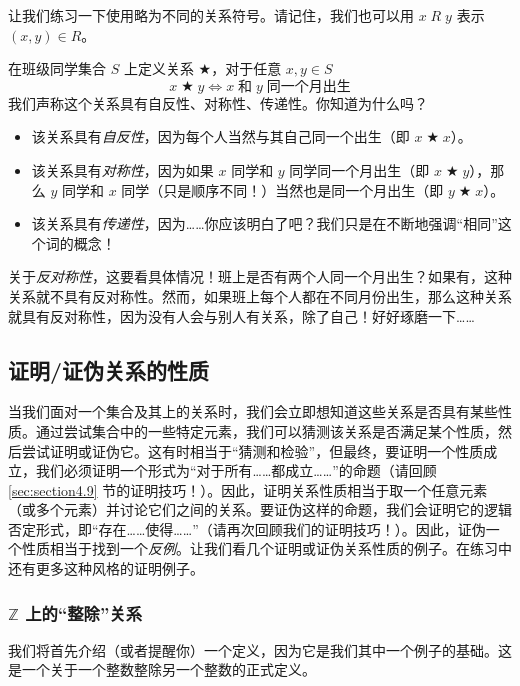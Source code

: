 \begin{example}
    让我们练习一下使用略为不同的关系符号。请记住，我们也可以用 $x \;R\; y$ 表示 $(x, y) \in R$。

    在班级同学集合 $S$ 上定义关系 $\bigstar$，对于任意 $x,y \in S$
    \[x \;\bigstar\; y \iff x \;\text{和}\; y \;\text{同一个月出生}\]
    我们声称这个关系具有自反性、对称性、传递性。你知道为什么吗？
    \begin{itemize}
        \item 该关系具有\emph{自反性}，因为每个人当然与其自己同一个出生（即 $x \;\bigstar\; x$）。
        \item 该关系具有\emph{对称性}，因为如果 $x$ 同学和 $y$ 同学同一个月出生（即 $x \;\bigstar\; y$），那么 $y$ 同学和 $x$ 同学（只是顺序不同！）当然也是同一个月出生（即 $y \;\bigstar\; x$）。
        \item 该关系具有\emph{传递性}，因为……你应该明白了吧？我们只是在不断地强调``相同''这个词的概念！
    \end{itemize}
    关于\emph{反对称性}，这要看具体情况！班上是否有两个人同一个月出生？如果有，这种关系就不具有反对称性。然而，如果班上每个人都在不同月份出生，那么这种关系就具有反对称性，因为没有人会与别人有关系，除了自己！好好琢磨一下……
\end{example}

\subsection{证明/证伪关系的性质}

当我们面对一个集合及其上的关系时，我们会立即想知道这些关系是否具有某些性质。通过尝试集合中的一些特定元素，我们可以猜测该关系是否满足某个性质，然后尝试证明或证伪它。这有时相当于``猜测和检验''，但最终，要证明一个性质成立，我们必须证明一个形式为``对于所有……都成立……''的命题（请回顾 \ref{sec:section4.9} 节的证明技巧！）。因此，证明关系性质相当于取一个任意元素（或多个元素）并讨论它们之间的关系。要证伪这样的命题，我们会证明它的逻辑否定形式，即``存在……使得……''（请再次回顾我们的证明技巧！）。因此，证伪一个性质相当于找到一个\emph{反例}。让我们看几个证明或证伪关系性质的例子。在练习中还有更多这种风格的证明例子。

\subsubsection*{$\mathbb{Z}$ 上的``整除''关系}

我们将首先介绍（或者提醒你）一个定义，因为它是我们其中一个例子的基础。这是一个关于一个整数整除另一个整数的正式定义。


